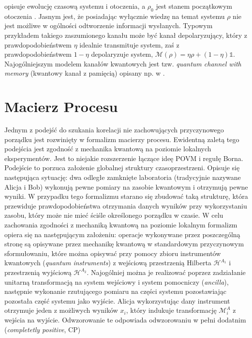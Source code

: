 \documentclass[10pt]{article} %
\newcommand{\I}{\mathbb{1}}
\begin{document}
opisuje ewolucję czasową systemu i otoczenia, a $\rho_0$ jest stanem początkowym otoczenia \cite{fund}. Jasnym jest, że posiadając wyłącznie wiedzę na temat systemu $\rho$ nie jest możliwe w ogólności odtworzenie informacji wysłanych.
Typowym przykładem takiego zaszumionego kanału może być kanał depolaryzujący, który z prawdopodobieństwem $\eta$ idealnie transmituje system, zaś z prawdopodobieństwem $1-\eta$ depolaryzuje system, $\mathcal{M}(\rho) = \eta\rho+(1-\eta)\I$. Najogólniejszym modelem kanałów kwantowych jest tzw.
\textit{quantum channel with memory} (kwantowy kanał z pamięcią) opisany np. w \cite{memory}.

\section{Macierz Procesu}
\label{macierz_procesu}
Jednym z podejść do szukania korelacji nie zachowujących przyczynowego porządku jest rozwinięty w \cite{process_matrix} formalizm macierzy procesu.
Ewidentną zaletą tego podejścia jest zgodność z mechanika kwantową na poziomie lokalnych eksperymentów. Jest to niejakie rozszerzenie łączące ideę POVM i regułę Borna. Podejście to porzuca założenie globalnej struktury czasoprzestrzeni. Opisuje się następująca sytuację: dwa odległe zamknięte laboratoria (tradycyjnie nazywane Alicja i Bob) wykonują pewne pomiary na zasobie kwantowym i otrzymują pewne wyniki. W przypadku tego formalizmu starano się zbudować taką strukturę, która przewiduje prawdopodobieństwa otrzymania danych wyników przy wykorzystaniu zasobu, który może nie mieć ściśle określonego porządku w czasie. W celu zachowania zgodności z mechaniką kwantową na poziomie lokalnym formalizm opiera się na następującym założeniu: operacje wykonywane przez poszczególną stronę są opisywane przez mechanikę kwantową w standardowym przyczynowym sformułowaniu, które można opisywać przy pomocy zbioru instrumentów kwantowych (\textit{quantum instruments}) \cite{quantum_instrument} z wejściową przestrzenią Hilberta $\mathcal{H}^{A_1}$ i przestrzenią wyjściową  $\mathcal{H}^{A_2}$. Najogólniej można je realizować poprzez zadziałanie unitarną transformacją na system wejściowy i system pomocniczy (\textit{ancilla}), następnie wykonanie rzutującego pomiaru na części systemu pozostawiając pozostała część systemu jako wyjście. Alicja wykorzystując dany instrument otrzymuje jeden z możliwych wyników $x_i$, który indukuje transformację $\mathcal{M}^A_i$ z wejścia na wyjście. Odwzorowanie te odpowiada odwzorowaniu w pełni dodatnim (\textit{completetly positive}, CP)
\end{document}
